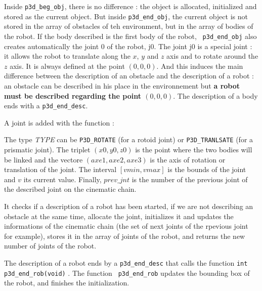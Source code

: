 Inside {\tt p3d\_beg\_obj}, there is no difference : the object is
allocated, initialized and stored as the current object. But inside
{\tt p3d\_end\_obj}, the current object is not stored in the array of
obstacles of teh environment, but in the array of bodies of the robot.
If the body described is the first body of the robot, {\tt
p3d\_end\_obj} also creates automatically the joint 0 of the robot,
j0. The joint j0 is a special joint : it allows the robot to translate
along the $x$, $y$ and $z$ axis and to rotate around the $z$ axis. It
is always defined at the point $(0,0,0)$. And this induces the main
difference between the description of an obstacle and the description
of a robot : an obstacle can be described in his place in the
environnement but {\bf a robot must be described regarding the point
$(0,0,0)$}. 
The description of a body ends with a {\tt p3d\_end\_desc}. 

A joint is added with the function :



The type {\it TYPE} can be {\tt P3D\_ROTATE}  (for a rotoid joint) or
{\tt P3D\_TRANLSATE}  (for a prismatic joint). The triplet $(x0,y0,z0)$ is
the point where the two bodies will be linked and the vectore
$(axe1,axe2,axe3)$ is the axis of rotation or translation of the
joint. The interval $[vmin,vmax]$ is the bounds of the joint and $v$ its
current value. Finally, $prev\_jnt$ is the number of the previous
joint of the described joint on the cinematic chain.

It checks if a description of a robot has been started, if we are not
describing an obstacle at the same time, allocate the joint,
initializes it and updates the informations of the cinematic chain
(the set of next joints of the rpevious joint for example), stores
it in the array of joints of the robot, and returns the new number of
joints of the robot.

The description of a robot ends by a {\tt p3d\_end\_desc} that calls
the function {\tt int p3d\_end\_rob(void)} . The function {\tt
p3d\_end\_rob} updates the bounding box of the robot, and finishes the
initialization.




